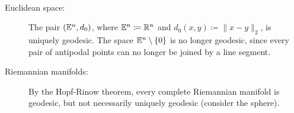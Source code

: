 
\begin{bsp}~
  \begin{description}
  \item[Euclidean space:] The pair \((\mathbb{E}^n, d_0)\), where \(\mathbb{E}^n \coloneqq \mathbb{R}^n\) and \(d_0(x,y) \coloneqq \|x - y\|_2\), is uniquely geodesic. The space \(\mathbb{E}^n \setminus \{0\}\) is no longer geodesic, since every pair of antipodal points can no longer be joined by a line segment. 
  \item[Riemannian manifolds:] By the Hopf-Rinow theorem, every complete Riemannian manifold is geodesic, but not necessarily uniquely geodesic (consider the sphere).
  \end{description}
\end{bsp}


